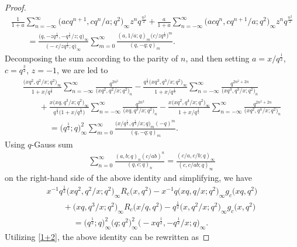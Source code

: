 \documentclass[pdftex]{sigma}
\numberwithin{equation}{section}
\begin{document}
\begin{proof}
\begin{gather*}
\frac{1}{1+a}\sum_{n=-\infty}^{\infty}
\bigl(acq^{n+1},cq^n/a;q^2\bigr)_{\infty}z^nq^{\frac{n^2}{2}}+\frac{a}{1+a}\sum_{n=-\infty}^{\infty}
\bigl(acq^n,cq^{n+1}/a;q^2\bigr)_{\infty}z^nq^{\frac{n^2}{2}}\\
\qquad=\frac{\bigl(q,-zq^{\frac{1}{2}},-q^{\frac{1}{2}}/z;q\bigr)_{\infty}}{\bigl(-c/zq^{\frac{1}{2}};q\bigr)_{\infty}}
\sum_{m=0}^{\infty}\frac{(a,1/a;q)_m\bigl(c/zq^{\frac{1}{2}}\bigr)^m}{(q,-q;q)_m}.
\end{gather*}
Decomposing the sum according to the parity of $n$,
and then setting $a=x/q^{\frac{1}{2}}$, $c=q^{\frac{3}{2}}$, $z=-1$, we are led to
\begin{gather*}
\frac{\bigl(xq^2,q^2/x;q^2\bigr)_{\infty}}{1+x/q^{\frac{1}{2}}}\sum_{n=-\infty}^{\infty}
\frac{q^{2n^2}}{\bigl(xq^2,q^2/x;q^2\bigr)_n}-\frac{q^{\frac{1}{2}}\bigl(xq^3,q^3/x;q^2\bigr)_{\infty}}{1+x/q^{\frac{1}{2}}}\sum_{n=-\infty}^{\infty}
\frac{q^{2n^2+2n}}{\bigl(xq^3,q^3/x;q^2\bigr)_n}\\
\qquad+\frac{x\bigl(xq,q^3/x;q^2\bigr)_{\infty}}{q^{\frac{1}{2}}\bigl(1+x/q^{\frac{1}{2}}\bigr)}\sum_{n=-\infty}^{\infty}
\frac{q^{2n^2}}{\bigl(xq,q^3/x;q^2\bigr)_n}-\frac{x\bigl(xq^2,q^4/x;q^2\bigr)_{\infty}}{1+x/q^{\frac{1}{2}}}\sum_{n=-\infty}^{\infty}
\frac{q^{2n^2+2n}}{\bigl(xq^2,q^4/x;q^2\bigr)_n}\\
\phantom{\qquad+}{}=\bigl(q^{\frac{1}{2}};q\bigr)_{\infty}^2
\sum_{m=0}^{\infty}\frac{\bigl(x/q^{\frac{1}{2}},q^{\frac{1}{2}}/x;q\bigr)_m(-q)^m}{(q,-q;q)_m}.
\end{gather*}
Using $q$-Gauss sum \cite[Appendix (II.8)]{GR}
\begin{align*}
\sum_{n=0}^{\infty}\frac{(a,b;q)_n(c/ab)^n}{(q,c;q)_n}
=\frac{(c/a,c/b;q)_{\infty}}{(c,c/ab;q)_{\infty}}
\end{align*}
on the right-hand side of the above identity and simplifying, we have
\begin{gather*}%
x^{-1}q^{\frac{1}{2}}\bigl(xq^2,q^2/x;q^2\bigr)_{\infty}R_c\bigl(x,q^2\bigr)
-x^{-1}q\bigl(xq,q/x;q^2\bigr)_{\infty}g_c\bigl(xq,q^2\bigr) \\
\qquad+\bigl(xq,q^3/x;q^2\bigr)_{\infty}R_c\bigl(x/q,q^2\bigr)
-q^{\frac{1}{2}}\bigl(x,q^2/x;q^2\bigr)_{\infty}g_c\bigl(x,q^2\bigr) \\
\phantom{\qquad+}{}=\bigl(q^{\frac{1}{2}};q\bigr)_{\infty}^2\bigl(q;q^2\bigr)_{\infty}^2
\bigl(-xq^{\frac{1}{2}},-q^{\frac{1}{2}}/x;q\bigr)_{\infty}.
\end{gather*}
Utilizing \eqref{1+2}, the above identity can be rewritten as

\end{proof}
\end{document}
